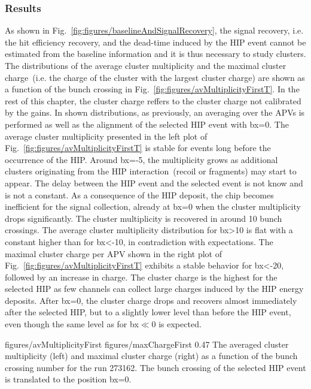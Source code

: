 \subsubsection{Results}

As shown in Fig.~\ref{fig:figures/baselineAndSignalRecovery}, the signal recovery, i.e. the hit efficiency recovery, and the dead-time induced by the HIP event cannot be estimated from the baseline information and it is thus necessary to study clusters. The distributions of the average cluster multiplicity and the maximal cluster charge~(i.e. the charge of the cluster with the largest cluster charge)  are shown as a function of the bunch crossing in Fig.~\ref{fig:figures/avMultiplicityFirstT}. In the rest of this chapter, the cluster charge reffers to the cluster charge not calibrated by the gains. In shown distributions, as previously, an averaging over the APVs is performed as well as the alignment of the selected HIP event with bx=0. The average cluster multiplicity presented in the left plot of Fig.~\ref{fig:figures/avMultiplicityFirstT} is stable for events long before the occurrence of the HIP. Around bx=-5, the multiplicity grows as additional clusters originating from the HIP interaction~(recoil or fragments) may start to appear. The delay between the HIP event and the selected event is not know and is not a constant. As a consequence of the HIP deposit, the chip becomes inefficient for the signal collection, already at bx=0 when  the cluster multiplicity drops significantly. The cluster multiplicity is recovered in around 10 bunch crossings. The average cluster multiplicity distribution for bx>10 is flat with a constant higher than for bx<-10, in contradiction with expectations. The maximal cluster charge per APV shown in the right plot of Fig.~\ref{fig:figures/avMultiplicityFirstT} exhibits a stable behavior for bx<-20, followed by an increase in charge. The cluster charge is the highest for the selected HIP as few channels can collect large charges induced by the HIP energy deposits. After bx=0, the cluster charge drops and recovers almost immediately after the selected HIP, but to a slightly lower level than before the HIP event, even though the same level as for bx$\ll$0 is expected. 

                 {figures/avMultiplicityFirst} %
                 {figures/maxChargeFirst} %
                 {0.47}       %
                 { The averaged cluster multiplicity (left) and maximal cluster charge (right) as a function of the bunch crossing number for the run 273162. The bunch crossing of the selected HIP event is translated to the position bx=0. } %

